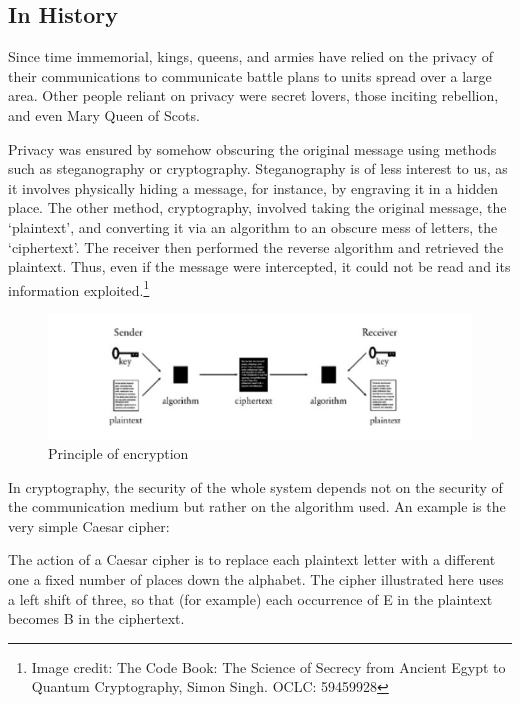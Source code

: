 \documentclass[titlepage]{article}
\begin{document}
\subsection{In History}
Since time immemorial, kings, queens, and armies have relied on the privacy of their communications
to communicate battle plans to units spread over a large area. Other people reliant on privacy were
secret lovers, those inciting rebellion, and even Mary Queen of Scots.

Privacy was ensured by somehow obscuring the original message using methods such as steganography or
cryptography. Steganography is of less interest to us, as it involves physically hiding a message,
for instance, by engraving it in a hidden place. The other method, cryptography, involved taking the
original message, the `plaintext', and converting it via an algorithm to an obscure mess of letters,
the `ciphertext'. The receiver then performed the reverse algorithm and retrieved the plaintext.
Thus, even if the message were intercepted, it could not be read and its information exploited.\footnote{Image
credit: The Code Book: The Science of Secrecy from Ancient Egypt to Quantum Cryptography, Simon
Singh. OCLC: 59459928}

\begin{figure}[H]
  \centering
  \includegraphics[scale=0.3]{cryp.png}
  \caption{Principle of encryption}
\end{figure}

In cryptography, the security of the whole system depends not on the security of the communication
medium but rather on the algorithm used. An example is the very simple Caesar cipher\cite{caesar}:

\begin{displayquote}
  The action of a Caesar cipher is to replace each plaintext letter with a different one a fixed
number of places down the alphabet. The cipher illustrated here uses a left shift of three, so that
(for example) each occurrence of E in the plaintext becomes B in the ciphertext.
\end{displayquote}
\end{document}
